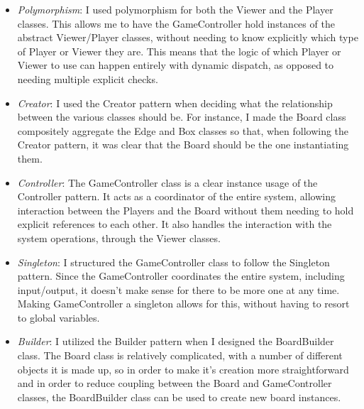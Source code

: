 \documentclass{article}
\begin{document}
    \begin{itemize}
        \item \emph{Polymorphism}: I used polymorphism for both the Viewer and
              the Player classes. This allows me to have the GameController hold
              instances of the abstract Viewer/Player classes, without needing
              to know explicitly which type of Player or Viewer they are. This
              means that the logic of which Player or Viewer to use can happen
              entirely with dynamic dispatch, as opposed to needing multiple
              explicit checks.
        \item \emph{Creator}: I used the Creator pattern when deciding what the
              relationship between the various classes should be. For instance,
              I made the Board class compositely aggregate the Edge and Box
              classes so that, when following the Creator pattern, it was clear
              that the Board should be the one instantiating them.
        \item \emph{Controller}: The GameController class is a clear instance
              usage of the Controller pattern. It acts as a coordinator of the
              entire system, allowing interaction between the Players and the
              Board without them needing to hold explicit references to each
              other. It also handles the interaction with the system operations,
              through the Viewer classes.
        \item \emph{Singleton}: I structured the GameController class to follow
              the Singleton pattern. Since the GameController coordinates the
              entire system, including input/output, it doesn't make sense for
              there to be more one at any time. Making GameController a
              singleton allows for this, without having to resort to global
              variables.
        \item \emph{Builder}: I utilized the Builder pattern when I designed the
              BoardBuilder class. The Board class is relatively complicated,
              with a number of different objects it is made up, so in order
              to make it's creation more straightforward and in order to reduce
              coupling between the Board and GameController classes, the
              BoardBuilder class can be used to create new board instances.
    \end{itemize}
\end{document}
